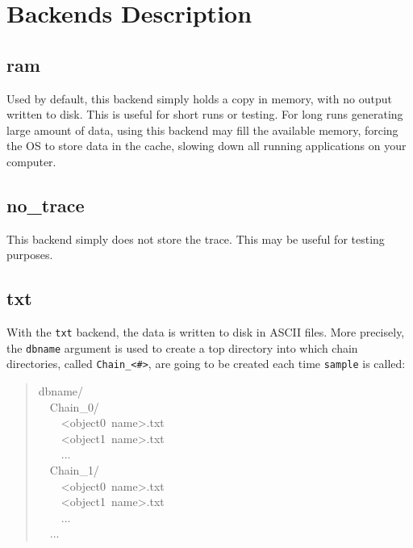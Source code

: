 
\hypertarget{backends-description}{}
\section*{Backends Description}
\label{backends-description}



\hypertarget{ram}{}
\subsection*{ram}
\label{ram}

Used by default, this backend simply holds a copy in memory, with no output
written to disk. This is useful for short runs or testing. For long runs
generating large amount of data, using this backend may fill the available
memory, forcing the OS to store data in the cache, slowing down all running
applications on your computer.



\hypertarget{no-trace}{}
\subsection*{no{\_}trace}
\label{no-trace}

This backend simply does not store the trace. This may be useful for testing
purposes.



\hypertarget{txt}{}
\subsection*{txt}
\label{txt}

With the \texttt{txt} backend, the data is written to disk in ASCII files.
More precisely, the \texttt{dbname} argument is used to create a top directory
into which chain directories, called \texttt{Chain{\_}<{\#}>}, are going to be created each
time \texttt{sample} is called:
\begin{quote}{\ttfamily \raggedright \noindent
dbname/~\\
~~Chain{\_}0/~\\
~~~~<object0~name>.txt~\\
~~~~<object1~name>.txt~\\
~~~~...~\\
~~Chain{\_}1/~\\
~~~~<object0~name>.txt~\\
~~~~<object1~name>.txt~\\
~~~~...~\\
~~...
}\end{quote}

